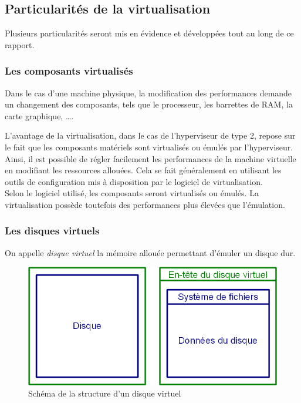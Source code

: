 \subsection{Particularités de la virtualisation}
\label{Particularités de la virtualisation}

Plusieurs particularités seront mis en évidence et développées tout au long de ce rapport.
\\




\subsubsection{Les composants virtualisés}
\label{Les composants virtualisés}

Dans le cas d'une machine physique, la modification des performances demande un changement des composants, tels que le processeur, les barrettes de RAM, la carte graphique, \ldots.

L'avantage de la virtualisation, dans le cas de l'hyperviseur de type 2, repose sur le fait que les composants matériels sont virtualisés ou émulés par l'hyperviseur.
Ainsi, il est possible de régler facilement les performances de la machine virtuelle en modifiant les ressources allouées.
Cela se fait généralement en utilisant les outils de configuration mis à disposition par le logiciel de virtualisation.
\\


Selon le logiciel utilisé, les composants seront virtualisés ou émulés.
La virtualisation possède toutefois des performances plus élevées que l'émulation.
\\




\subsubsection{Les disques virtuels}
\label{Les disques virtuels}

On appelle \textit{disque virtuel} la mémoire allouée permettant d'émuler un disque dur.

\begin{figure}[!h]
	\center
	\includegraphics[scale=0.5]{img/Disque_virtuel.png}
	\caption{Schéma de la structure d'un disque virtuel}
	\label{Schéma Disque virtuel}
\end{figure}

